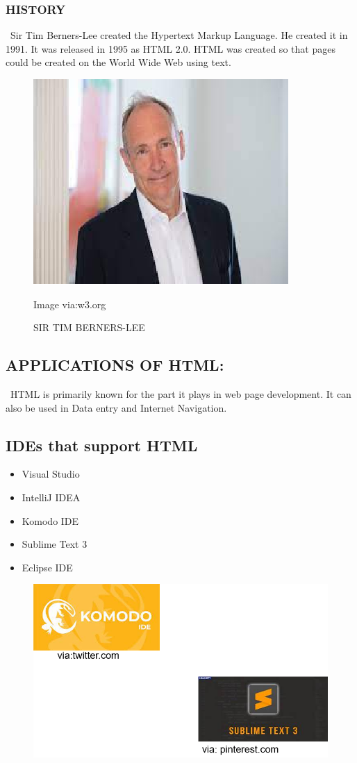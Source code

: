 \documentclass[12pt]{article}
\begin{document}
\subsubsection{HISTORY}
        \ Sir Tim Berners-Lee created the Hypertext Markup Language. He created it in 1991. It was released in 1995 as HTML 2.0. HTML was created so that pages could be created on the World Wide Web using text.
        
\begin{figure}[h]
	\includegraphics[width=0.7\linewidth]{screenshot015}
	\caption{SIR TIM BERNERS-LEE}{Image via:w3.org}
	\label{fig:screenshot015}
\end{figure}

\newpage

\subsection{APPLICATIONS OF HTML:}
           \  HTML is primarily known for the part it plays in web page development. It can also be used in Data entry and Internet Navigation.
           
\newpage

\subsection{IDEs that support HTML}
           \begin{itemize}
           	\item Visual Studio
           	\item IntelliJ IDEA
           	\item Komodo IDE
           	\item Sublime Text 3
           	\item Eclipse IDE
           \end{itemize}
       
\begin{figure}[h]
	\includegraphics[width=0.7\linewidth]{screenshot016}
	\caption{}
	\label{fig:screenshot016}
\end{figure}
\end{document}
